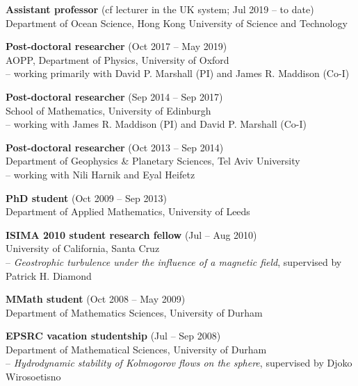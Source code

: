 \documentclass[letterpaper]{article}
\renewenvironment{itemize}{
  \begin{list}{}{
    \setlength{\leftmargin}{1.5em}
  }
}{
  \end{list}
}
\begin{document}
\begin{itemize}

\item \textbf{Assistant professor} (cf lecturer in the UK system; Jul 2019 -- to date)\\
Department of Ocean Science, Hong Kong University of Science and Technology

\item \textbf{Post-doctoral researcher} (Oct 2017 -- May 2019)\\
AOPP, Department of Physics, University of Oxford\\
-- working primarily with David P. Marshall (PI) and James R. Maddison (Co-I) 

\item \textbf{Post-doctoral researcher} (Sep 2014 -- Sep 2017)\\
School of Mathematics, University of Edinburgh\\
-- working with James R. Maddison (PI) and David P. Marshall (Co-I)

\item \textbf{Post-doctoral researcher} (Oct 2013 -- Sep 2014)\\
Department of Geophysics \& Planetary Sciences, Tel Aviv University\\
-- working with Nili Harnik and Eyal Heifetz

\item \textbf{PhD student}  (Oct 2009 -- Sep 2013)\\
Department of Applied Mathematics, University of Leeds
	
\item \textbf{ISIMA 2010 student research fellow} (Jul -- Aug 2010)\\
University of California, Santa Cruz\\
-- \textit{Geostrophic turbulence under the influence of a magnetic field},
supervised by Patrick H. Diamond
	
\item \textbf{MMath student} (Oct 2008 -- May 2009)\\
Department of Mathematics Sciences, University of Durham 
	
\item \textbf{EPSRC vacation studentship} (Jul -- Sep 2008)\\
Department of Mathematical Sciences, University of Durham\\
-- \textit{Hydrodynamic stability of Kolmogorov flows on the sphere},
supervised by Djoko Wirosoetisno
	
\end{itemize}
\end{document}
